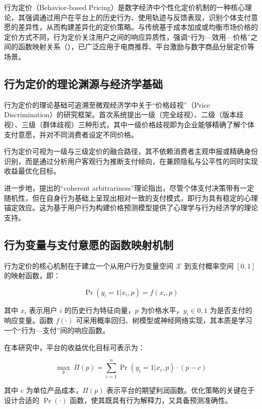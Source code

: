 行为定价（Behavior-based Pricing）是数字经济中个性化定价机制的一种核心理论，其强调通过用户在平台上的历史行为、使用轨迹与反馈表现，识别个体支付意愿的差异性，从而构建差异化的定价策略。与传统基于成本加成或均衡市场价格的定价方式不同，行为定价关注用户之间的响应异质性，强调“行为—效用—价格”之间的函数映射关系（\cite{chen2002consumer}），已广泛应用于电商推荐、平台激励与数字商品分层定价等场景。

\subsection{行为定价的理论渊源与经济学基础}

行为定价的理论基础可追溯至微观经济学中关于“价格歧视”（Price Discrimination）的研究框架。\cite{pigou1920economics}首次系统提出一级（完全歧视）、二级（版本歧视）、三级（群体歧视）三种形式，其中一级价格歧视即为企业能够精确了解个体支付意愿，并对不同消费者设定不同价格。

行为定价可视为一级与三级定价的融合路径，其不依赖消费者主观申报或精确身份识别，而是通过分析用户客观行为推断支付倾向，在兼顾隐私与公平性的同时实现收益最优化目标。

进一步地，\cite{ariely2003}提出的“coherent arbitrariness”理论指出，尽管个体支付决策带有一定随机性，但在自身行为基础上呈现出相对一致的支付模式，即行为具有稳定的心理锚定效应。这为基于用户行为构建价格预测模型提供了心理学与行为经济学的理论支持。

\subsection{行为变量与支付意愿的函数映射机制}

行为定价的核心机制在于建立一个从用户行为变量空间 $\mathcal{X}$ 到支付概率空间 $[0, 1]$ 的映射函数，即：

\begin{equation}
\Pr(y_i = 1 | x_i, p) = f(x_i, p)
\end{equation}

其中 $x_i$ 表示用户 $i$ 的历史行为特征向量，$p$ 为价格水平，$y_i \in {0, 1}$ 为是否支付的响应变量。函数 $f(\cdot)$ 可采用概率回归、树模型或神经网络实现，其本质是学习一个“行为—支付”间的响应函数。

在本研究中，平台的收益优化目标可表示为：

\begin{equation}
\max_{p} \ \Pi(p) = \sum_{i=1}^{n} \Pr(y_i = 1 | x_i, p) \cdot (p - c)
\end{equation}

其中 $c$ 为单位产品成本，$\Pi(p)$ 表示平台的期望利润函数。优化策略的关键在于设计合适的 $\Pr(\cdot)$ 函数，使其既具有行为解释力，又具备预测准确性。

